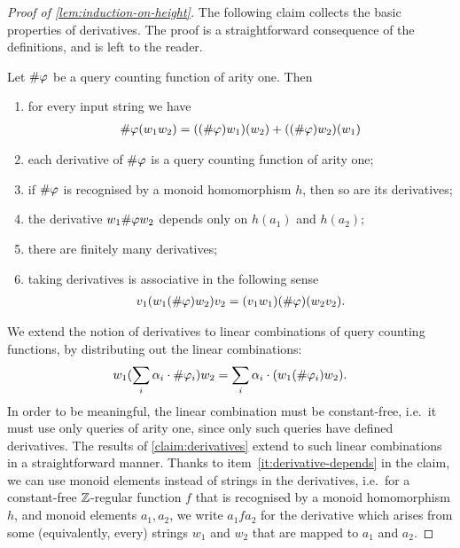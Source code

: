 \begin{proof}[Proof of \cref{lem:induction-on-height}]
The following claim collects the basic properties of derivatives. The proof is a straightforward consequence of the definitions, and is left to the reader.  
\begin{claim}\label{claim:derivatives}
    Let $\#{\varphi}$ be a query counting function of arity one. Then
    \begin{enumerate}
        \item \label{it:derivative-add} for every input string we have
         \begin{align*}
\#{\varphi}(w_1 w_2) = 
((\#{\varphi}) w_1) (w_2) 
+ 
((\#{\varphi}) w_2) (w_1)
\end{align*}
        \item \label{it:derivative-homo} each derivative of $\#{\varphi}$ is a query counting function of arity one;
        \item \label{it:derivative-homo2} if $\#{\varphi}$ is recognised by a monoid homomorphism $h$, then so are  its derivatives;
                \item \label{it:derivative-depends} the derivative $w_1 \#{\varphi} w_2$ depends only on $h(a_1)$ and $h(a_2)$;
                \item \label{it:derivative-finite} there are finitely many derivatives;
        \item  \label{it:derivative-associative} taking derivatives is associative in the following sense
        \begin{align*}
        v_1 (w_1 (\#{\varphi}) w_2) v_2 = (v_1 w_1) (\#{\varphi}) (w_2 v_2).
        \end{align*}
    \end{enumerate}
\end{claim}


We extend the notion of derivatives to linear combinations of query counting functions,  by distributing out the linear combinations:
\begin{align*}
w_1(\sum_i \alpha_i \cdot  \#{\varphi_i}) w_2 = \sum_i \alpha_i \cdot (w_1(\#{\varphi_i}) w_2).
\end{align*} 
In order to be meaningful,  the linear combination must be constant-free, i.e.~it must use only queries of arity one, since only such queries have  defined derivatives. 
The results of \cref{claim:derivatives} extend to such  linear combinations in a straightforward manner. Thanks to item~\ref{it:derivative-depends} in the claim, we can use monoid elements instead of strings in the derivatives, i.e.~for a constant-free ${\mathbb Z}$-regular function $f$ that is recognised by a monoid homomorphism $h$, and monoid elements $a_1, a_2$, we write $a_1 f a_2$ for the derivative which arises from some (equivalently, every) strings $w_1$ and $w_2$ that are mapped to $a_1$ and $a_2$. 



\end{proof}
